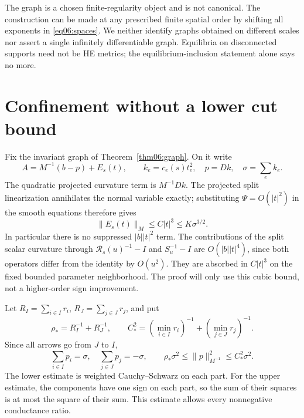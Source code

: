 \documentclass[11pt]{amsart}
\theoremstyle{definition}
\theoremstyle{remark}
\begin{document}
\enlargethispage{-2\baselineskip}
The graph is a chosen finite-regularity object and is not canonical.
The construction can be made at any prescribed finite spatial order
by shifting all exponents in \eqref{eq06:spaces}. We neither identify
graphs obtained on different scales nor assert a single infinitely
differentiable graph. Equilibria on disconnected supports need not
be HE metrics; the equilibrium-inclusion statement alone says no more.

\section{Confinement without a lower cut bound}\label{sec07:confinement}

Fix the invariant graph of Theorem~\ref{thm06:graph}. On it write
\begin{equation}\label{eq07:field}
 A=M^{-1}(b-p)+E_s(t),\qquad
 k_e=c_e(s)t_e^2,\quad p=Dk,\quad\sigma=\sum_ek_e.
\end{equation}
The quadratic projected curvature term is \(M^{-1}Dk\).
The projected split linearization annihilates the normal variable
exactly; substituting \(\Psi=O(|t|^2)\) in the smooth equations
therefore gives
\begin{equation}\label{eq07:error}
 \|E_s(t)\|_M\le C|t|^3\le K\sigma^{3/2}.
\end{equation}
In particular there is no suppressed \(|b||t|^2\) term.
The contributions of the split scalar curvature through
\(\mathcal R_s(u)^{-1}-I\) and \(S_u^{-1}-I\) are
\(O(|b||t|^4)\), since both operators differ from the identity
by \(O(u^2)\). They are absorbed in \(C|t|^3\) on the fixed
bounded parameter neighborhood. The proof
will only use this cubic bound, not a higher-order sign improvement.

Let \(R_I=\sum_{i\in I}r_i\), \(R_J=\sum_{j\in J}r_j\), and put
\[
 \rho_*=R_I^{-1}+R_J^{-1},\qquad
 C_*^2=(\min_{i\in I}r_i)^{-1}+(\min_{j\in J}r_j)^{-1}.
\]
Since all arrows go from \(J\) to \(I\),
\begin{equation}\label{eq07:mass}
 \sum_{i\in I}p_i=\sigma,\quad\sum_{j\in J}p_j=-\sigma,
 \qquad \rho_*\sigma^2\le\|p\|_{M^{-1}}^2\le C_*^2\sigma^2.
\end{equation}
The lower estimate is weighted Cauchy--Schwarz on each part. For
the upper estimate, the components have one sign on each part,
so the sum of their squares is at most the square of their sum.
This estimate allows every nonnegative conductance ratio.
\end{document}
